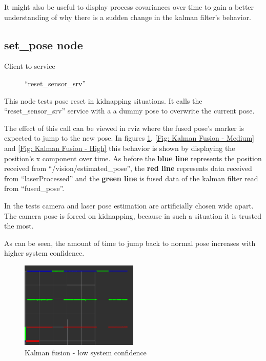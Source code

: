 It might also be useful to display process covariances over time to gain a better understanding of why there is a sudden change in the kalman filter's behavior.

\subsection{set\_pose node}
\begin{description}
\item[Client to service] ``reset\_sensor\_srv''
\end{description}
This node tests pose reset in kidnapping situations. It calls the ``reset\_sensor\_srv'' service with a a dummy pose to overwrite the current pose.

The effect of this call can be viewed in rviz where the fused pose's marker is expected to jump to the new pose. In figures \ref{Fig: Kalman Fusion - Low}, \ref{Fig: Kalman Fusion - Medium} and \ref{Fig: Kalman Fusion - High} this behavior is shown by displaying the position's x component over time. As before the \textbf{blue line} represents the position received from ``/vision/estimated\_pose'', the \textbf{red line} represents data received from ``laserProcessed'' and the \textbf{green line} is fused data of the kalman filter read from ``fused\_pose''.

In the tests camera and laser pose estimation are artificially chosen wide apart. The camera pose is forced on kidnapping, because in such a situation it is trusted the most.

As can be seen, the amount of time to jump back to normal pose increases with higher system confidence.

\begin{figure}[thpb]
      \centering
      \includegraphics[width=0.5\textwidth]{graphics/kalman_fast.png}
      \caption{Kalman fusion - low system confidence}
      \label{Fig: Kalman Fusion - Low}
   \end{figure}


